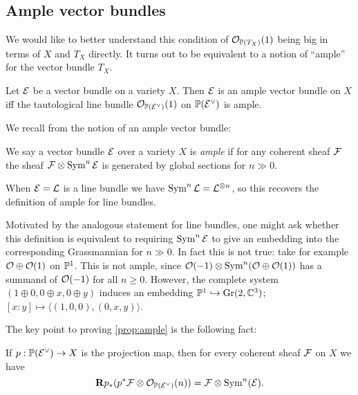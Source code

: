 \subsection{Ample vector bundles}

We would like to better understand this condition of $\O_{\P(T_X)}(1)$ being
big in terms of $X$ and $T_X$ directly. It turns out to be equivalent to a
notion of ``ample'' for the vector bundle $T_X$.

\begin{proposition} \label{prop:ample}
    Let $\calE$ be a vector bundle on a variety $X$. Then $\calE$ is an ample
    vector bundle on $X$ iff the tautological line bundle
    $\O_{\P(\calE^\vee)}(1)$ on $\P(\calE^\vee)$ is ample.
\end{proposition}

We recall from \cite{hartshorne_66} the notion of an ample vector bundle:

\begin{definition}
    We say a vector bundle $\calE$ over a variety $X$ is \emph{ample} if for any
    coherent sheaf $\calF$ the sheaf $\calF\otimes\Sym^n\calE$ is generated by
    global sections for $n\gg0$.
\end{definition}

\begin{remark}
    When $\calE=\calL$ is a line bundle we have $\Sym^n\calL=\calL^{\otimes n}$,
    so this recovers the definition of ample for line bundles.
\end{remark}

\begin{remark}
    Motivated by the analogous statement for line bundles, one might ask whether
    this definition is equivalent to requiring $\Sym^n\calE$ to give an
    embedding into the corresponding Grassmannian for $n\gg0$. In fact this is
    not true: take for example $\O\oplus\O(1)$ on $\P^1$. This is not ample,
    since $\O(-1)\otimes\Sym^n(\O\oplus\O(1))$ has a summand of $\O(-1)$ for all
    $n\ge0$. However, the complete system $(1\oplus0,0\oplus x,0\oplus y)$
    induces an embedding $\P^1\hookrightarrow\Gr(2,\C^3)$;
    $[x:y]\mapsto\langle(1,0,0),(0,x,y)\rangle$.
\end{remark}

The key point to proving \cref{prop:ample} is the following fact:

\begin{lemma}
    If $p:\P(\calE^\vee)\to X$ is the projection map, then for every coherent
    sheaf $\calF$ on $X$ we have
    \begin{equation*}
        \dR p_*(p^*\calF\otimes\O_{\P(\calE^\vee)}(n))
            = \calF\otimes\Sym^n(\calE).
    \end{equation*}
\end{lemma}


